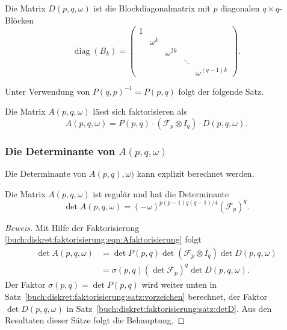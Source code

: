 \begin{definition}
Die Matrix $D(p,q,\omega)$ ist die Blockdiagonalmatrix mit $p$ diagonalen
$q\times q$-Blöcken
\[
\operatorname{diag}(
B_k
)
=
\begin{pmatrix}
1&        &           &      &               \\
 &\omega^k&           &      &               \\
 &        &\omega^{2k}&      &               \\
 &        &           &\ddots&               \\
 &        &           &      &\omega^{(q-1)k}
\end{pmatrix}.
\]
\end{definition}

Unter Verwendung von $P(q,p)^{-1}=P(p,q)$ folgt der folgende Satz.

\begin{satz}
Die Matrix $A(p,q,\omega)$ lässt sich faktorisieren als
\begin{equation}
A(p,q,\omega)
=
P(p,q)
\cdot
(\mathscr{F}_p\otimes I_q)
\cdot
D(p,q,\omega).
\label{buch:diskret:faktorisierung:eqn:Afaktorisierung}
\end{equation}
\end{satz}

%
%
\subsubsection{Die Determinante von $A(p,q,\omega)$}
Die Determinante von $A(p,q),\omega)$ kann explizit berechnet werden.

%
%
\begin{satz}
\label{buch:diskret:vandermonde:hauptsatz}
Die Matrix $A(p,q,\omega)$ ist regulär und hat die Determinante
\begin{equation}
\det A(p,q,\omega)
=
(-\omega)^{p(p-1)q(q-1)/4}
(\mathscr{F}_p)^q.
\label{buch:diskret:vandermonde:eqn:detA}
\end{equation}
\end{satz}

\begin{proof}[Beweis]
Mit Hilfe der Faktorisierung 
\eqref{buch:diskret:faktorisierung:eqn:Afaktorisierung}
folgt
\begin{align*}
\det A(p,q,\omega)
&=
\det P(p,q)
\det (\mathscr{F}_p\otimes I_q)
\det D(p,q,\omega)
\\
&=
\sigma(p,q) (\det\mathscr{F}_p)^q \det D(p,q,\omega).
\end{align*}
Der Faktor $\sigma(p,q)=\det P(p,q)$ wird weiter unten in
Satz~\eqref{buch:diskret:faktorisierung:satz:vorzeichen}
berechnet, der Faktor $\det D(p,q,\omega)$ in
Satz~\eqref{buch:diskret:faktorisierung:satz:detD}.
Aus den Resultaten dieser Sätze folgt die Behauptung.
\end{proof}

